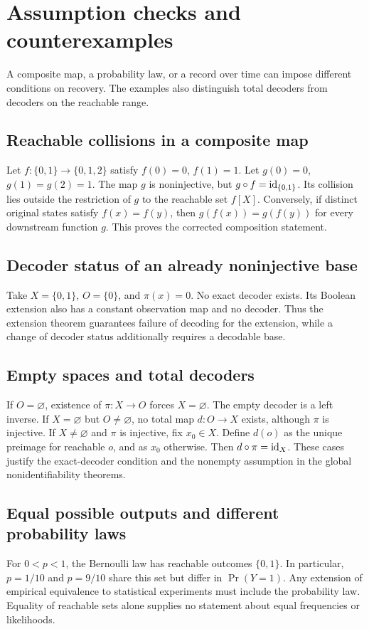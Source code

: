 \section{Assumption checks and counterexamples}
\label{app:scopechecks}
A composite map, a probability law, or a record over time can impose different conditions on recovery. The examples also distinguish total decoders from decoders on the reachable range.

\subsection{Reachable collisions in a composite map}
Let \(f:\{0,1\}\to\{0,1,2\}\) satisfy \(f(0)=0\), \(f(1)=1\). Let \(g(0)=0\), \(g(1)=g(2)=1\). The map \(g\) is noninjective, but \(g\circ f=\operatorname{id}_{\{0,1\}}\). Its collision lies outside the restriction of \(g\) to the reachable set \(f[X]\). Conversely, if distinct original states satisfy \(f(x)=f(y)\), then \(g(f(x))=g(f(y))\) for every downstream function \(g\). This proves the corrected composition statement.

\subsection{Decoder status of an already noninjective base}
Take \(X=\{0,1\}\), \(O=\{0\}\), and \(\pi(x)=0\). No exact decoder exists. Its Boolean extension also has a constant observation map and no decoder. Thus the extension theorem guarantees failure of decoding for the extension, while a change of decoder status additionally requires a decodable base.

\subsection{Empty spaces and total decoders}
If \(O=\varnothing\), existence of \(\pi:X\to O\) forces \(X=\varnothing\). The empty decoder is a left inverse. If \(X=\varnothing\) but \(O\neq\varnothing\), no total map \(d:O\to X\) exists, although \(\pi\) is injective. If \(X\neq\varnothing\) and \(\pi\) is injective, fix \(x_0\in X\). Define \(d(o)\) as the unique preimage for reachable \(o\), and as \(x_0\) otherwise. Then \(d\circ\pi=\operatorname{id}_X\). These cases justify the exact-decoder condition and the nonempty assumption in the global nonidentifiability theorems.

\subsection{Equal possible outputs and different probability laws}
For \(0<p<1\), the Bernoulli law has reachable outcomes \(\{0,1\}\). In particular, \(p=1/10\) and \(p=9/10\) share this set but differ in \(\Pr(Y=1)\). Any extension of empirical equivalence to statistical experiments must include the probability law. Equality of reachable sets alone supplies no statement about equal frequencies or likelihoods.


